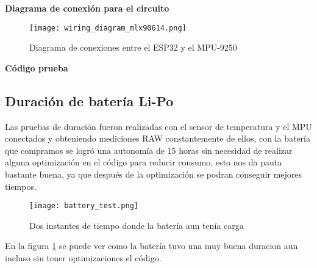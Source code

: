         \textbf{Diagrama de conexión para el circuito}
        \begin{figure}[htp!]
            \centering
                \texttt{[image: wiring\_diagram\_mlx90614.png]}
                \caption{Diagrama de conexiones entre el ESP32 y el MPU-9250}
            \end{figure}
            \FloatBarrier 
        \textbf{Código prueba}

        \lstset{style=mystyle}

        
        
        \subsection{Duración de batería Li-Po}
        
        Las pruebas de duración fueron realizadas con el sensor de temperatura y el MPU conectados y obteniendo mediciones RAW 
        constantemente de ellos, con la batería que compramos se logró una autonomía de 15 horas sin necesidad de realizar alguna 
        optimización en el código para reducir consumo, esto nos da pauta bastante buena, ya que después de la optimización se 
        podran conseguir mejores tiempos.

        \begin{figure}[htp!]
            \centering
                 \texttt{[image: battery\_test.png]}
                  \caption{Dos instantes de tiempo donde la batería aun tenía carga }
                  \label{fig: battery_test}
        \end{figure}
        \FloatBarrier

        En la figura \ref{fig: battery_test} se puede ver como la batería tuvo una muy buena duracion aun incluso sin tener optimizaciones
        el código.

